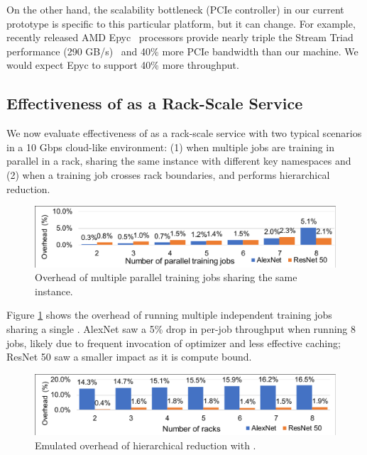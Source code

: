 On the other hand, the scalability bottleneck (PCIe controller) in our current prototype is specific to this particular platform, but it can change. For example, recently released AMD Epyc~\cite{AMDEpyc} processors provide nearly triple the Stream Triad performance
(290 GB/s)~\cite{EpycBenchmark} and 40\% more PCIe bandwidth than our
\pbox machine. We would expect Epyc to support 40\% more
throughput.


\subsection{Effectiveness of \pbox as a Rack-Scale Service}
\label{sec:hierarchicalEval}
We now evaluate effectiveness of \pbox as a rack-scale service with two typical scenarios in a 10 Gbps cloud-like environment: (1) when multiple jobs are training in parallel in a rack, sharing the same \pbox instance with different key namespaces and (2) when a training job crosses rack boundaries, and \phub performs hierarchical reduction.

\begin{figure}[t!]
    \centering
	\includegraphics[width=.7\linewidth,trim=2 2 2 2,clip]{Figures/MultijobSim.pdf}
	\caption{Overhead of multiple parallel training jobs sharing the same \pbox instance.}
	\label{fig:multijobs}
\end{figure}

Figure \ref{fig:multijobs} shows the overhead of running multiple independent training jobs sharing a single \pbox. AlexNet saw a 5\% drop in per-job throughput when running 8 jobs, likely due to frequent invocation of optimizer and less effective caching; ResNet 50 saw a smaller impact as it is compute bound.

\begin{figure}[t!]
    \centering
	\includegraphics[width=.5\linewidth,trim=2 6 2 2,clip]{Figures/HierarchicalSim.pdf}
	\caption{Emulated overhead of hierarchical reduction with \pbox.}
	\label{fig:hierarchical}
\end{figure}

